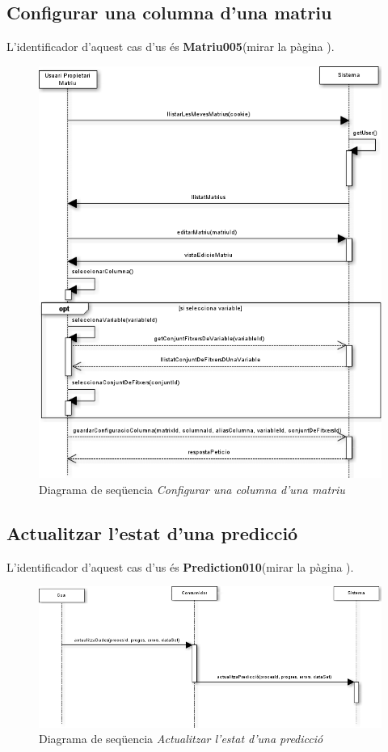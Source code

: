 \subsection*{Configurar una columna d'una matriu}
L'identificador d'aquest cas d'us \'{e}s \textbf{Matriu005}(mirar la p\`{a}gina \pageref{matriu005}).
\begin{figure}[H]
  \centering
  \includegraphics[scale=0.6]{img/specification/SequenceConfigureColumn.png}
  \caption{Diagrama de seqüencia \textit{Configurar una columna d'una matriu} }
  \label{fig:sequenceconfigurecolumn}
\end{figure}

\subsection*{Actualitzar l'estat d'una predicci\'{o}}
L'identificador d'aquest cas d'us \'{e}s \textbf{Prediction010}(mirar la p\`{a}gina \pageref{prediction010}).
\begin{figure}[H]
  \centering
  \includegraphics[scale=0.6]{img/specification/SequenceUpdatePrediccio.png}
  \caption{Diagrama de seqüencia \textit{Actualitzar l'estat d'una predicci\'{o}} }
  \label{fig:sequenceupdateprediccio}
\end{figure}
